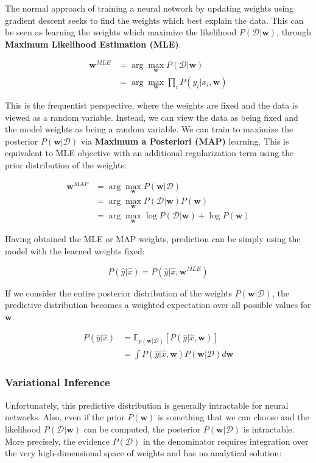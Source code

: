 The normal approach of training a neural network by updating weights using gradient descent seeks to find the weights which best explain the data. This can be seen as learning the weights which maximize the likelihood $P(\mathcal{D}|\mathbf{w})$, through \textbf{Maximum Likelihood Estimation (MLE)}.

\begin{align}
    \mathbf{w}^{MLE} &= \arg\max_{\mathbf{w}} P(\mathcal{D}|\mathbf{w}) \\
    & = \arg\max_{\mathbf{w}} \prod_i P(y_i|x_i, \mathbf{w})
\end{align}

This is the frequentist perspective, where the weights are fixed and the data is viewed as a random variable. 
Instead, we can view the data as being fixed and the model weights as being a random variable. We can train to maximize the posterior $P(\mathbf{w}|\mathcal{D})$ via \textbf{Maximum a Posteriori (MAP)} learning. This is equivalent to MLE objective  with an additional regularization term using the prior distribution of the weights:

\begin{align}
    \mathbf{w}^{MAP} &= \arg\max_{\mathbf{w}} P(\mathbf{w}|\mathcal{D}) \\
    & = \arg\max_{\mathbf{w}} P(\mathcal{D}|\mathbf{w})P(\mathbf{w}) \\
    & = \arg\max_{\mathbf{w}} \log P(\mathcal{D}|\mathbf{w}) + \log P(\mathbf{w})
\end{align}

Having obtained the MLE or MAP weights, prediction can be simply using the model with the learned weights fixed:

\begin{equation}
    P(\hat{y}|\hat{x}) = P(\hat{y}|\hat{x}, \mathbf{w}^{MLE})
\end{equation}


If we consider the entire posterior distribution of the weights $P(\mathbf{w}|\mathcal{D})$, the predictive distribution becomes a weighted expectation over all possible values for $\mathbf{w}$.

\begin{align}
    P(\hat{y}|\hat{x}) & = \mathbb{E}_{p(\mathbf{w}|\mathcal{D})}[P(\hat{y}|\hat{x}, \mathbf{w})] \\
    & = \int P(\hat{y}|\hat{x}, \mathbf{w})P(\mathbf{w}|\mathcal{D}) d\mathbf{w}
\end{align}

\subsubsection{Variational Inference}
Unfortunately, this predictive distribution is generally intractable for neural networks. Also, even if the prior $P(\mathbf{w})$ is something that we can choose and the likelihood $P(\mathcal{D}|\mathbf{w})$ can be computed, the posterior $P(\mathbf{w}|\mathcal{D})$ is intractable. More precisely, the evidence $P(\mathcal{D})$ in the denominator requires integration over the very high-dimensional space of weights and has no analytical solution:

